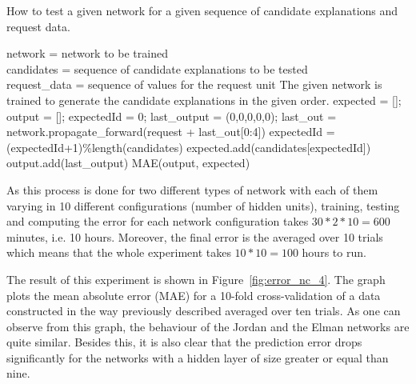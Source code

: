 \begin{tcolorbox}
\begin{algorithm}
\normalfont
How to test a given network for a given sequence of candidate explanations and request data.
\label{alg:test}
\begin{algorithmic}[1]
\REQUIRE network = network to be trained\\
\hspace{0.5cm} candidates = sequence of candidate explanations to be tested\\
\hspace{0.5cm} request\_data = sequence of values for the request unit
\ENSURE The given network is trained to generate the candidate explanations in the given order.
\bigskip
{}
\STATE expected = []; output = []; expectedId = 0; last\_output = (0,0,0,0,0);
	\STATE last\_out = network.propagate\_forward(request + last\_out[0:4])
		\STATE expectedId = (expectedId+1)\%length(candidates)
		\STATE expected.add(candidates[expectedId])
		\STATE output.add(last\_output)
	\ENDIF
\ENDFOR
\RETURN MAE(output, expected)
\ENDWHILE
\end{algorithmic}
\end{algorithm}
\end{tcolorbox}

As this process is done for two different types of network with each of them varying in 10 different configurations (number of hidden units), training, testing and computing the error for each network configuration takes $30 * 2 * 10 = 600$ minutes, i.e. 10 hours. Moreover, the final error is the averaged over 10 trials which means that the whole experiment takes $10 * 10 = 100$ hours to run.

The result of this experiment is shown in Figure~\ref{fig:error_nc_4}. The graph plots the mean absolute error (MAE) for a 10-fold cross-validation of a data constructed in the way previously described averaged over ten trials. As one can observe from this graph, the behaviour of the Jordan and the Elman networks are quite similar. Besides this, it is also clear that the prediction error drops significantly for the networks with a hidden layer of size greater or equal than nine.

